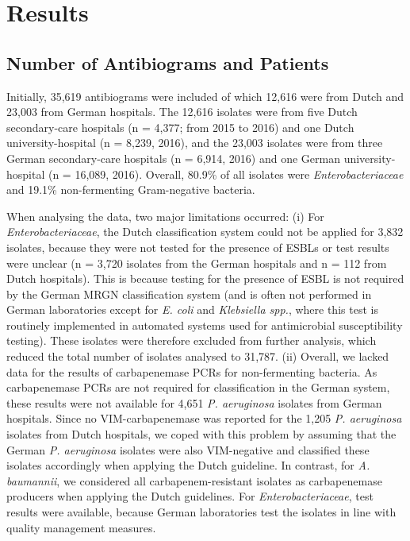 \documentclass[
]{book}
\begin{document}
\hypertarget{results-3}{%
\section{Results}\label{results-3}}

\hypertarget{number-of-antibiograms-and-patients}{%
\subsection{Number of Antibiograms and Patients}\label{number-of-antibiograms-and-patients}}

Initially, 35,619 antibiograms were included of which 12,616 were from Dutch and 23,003 from German hospitals. The 12,616 isolates were from five Dutch secondary-care hospitals (n = 4,377; from 2015 to 2016) and one Dutch university-hospital (n = 8,239, 2016), and the 23,003 isolates were from three German secondary-care hospitals (n = 6,914, 2016) and one German university-hospital (n = 16,089, 2016). Overall, 80.9\% of all isolates were \emph{Enterobacteriaceae} and 19.1\% non-fermenting Gram-negative bacteria.

When analysing the data, two major limitations occurred: (i) For \emph{Enterobacteriaceae}, the Dutch classification system could not be applied for 3,832 isolates, because they were not tested for the presence of ESBLs or test results were unclear (n = 3,720 isolates from the German hospitals and n = 112 from Dutch hospitals). This is because testing for the presence of ESBL is not required by the German MRGN classification system (and is often not performed in German laboratories except for \emph{E. coli} and \emph{Klebsiella spp.}, where this test is routinely implemented in automated systems used for antimicrobial susceptibility testing). These isolates were therefore excluded from further analysis, which reduced the total number of isolates analysed to 31,787. (ii) Overall, we lacked data for the results of carbapenemase PCRs for non-fermenting bacteria. As carbapenemase PCRs are not required for classification in the German system, these results were not available for 4,651 \emph{P. aeruginosa} isolates from German hospitals. Since no VIM-carbapenemase was reported for the 1,205 \emph{P. aeruginosa} isolates from Dutch hospitals, we coped with this problem by assuming that the German \emph{P. aeruginosa} isolates were also VIM-negative and classified these isolates accordingly when applying the Dutch guideline. In contrast, for \emph{A. baumannii}, we considered all carbapenem-resistant isolates as carbapenemase producers when applying the Dutch guidelines. For \emph{Enterobacteriaceae}, test results were available, because German laboratories test the isolates in line with quality management measures.
\end{document}

